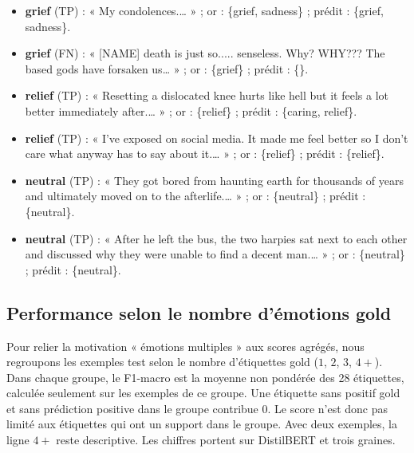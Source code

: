 \begin{itemize}
\item \textbf{grief} (TP) : « My condolences.… » ; or : \{grief, sadness\} ; prédit : \{grief, sadness\}.
\item \textbf{grief} (FN) : « [NAME] death is just so..... senseless. Why? WHY??? The based gods have forsaken us… » ; or : \{grief\} ; prédit : \{\}.
\item \textbf{relief} (TP) : « Resetting a dislocated knee hurts like hell but it feels a lot better immediately after.… » ; or : \{relief\} ; prédit : \{caring, relief\}.
\item \textbf{relief} (TP) : « I've exposed on social media. It made me feel better so I don't care what anyway has to say about it.… » ; or : \{relief\} ; prédit : \{relief\}.
\item \textbf{neutral} (TP) : « They got bored from haunting earth for thousands of years and ultimately moved on to the afterlife.… » ; or : \{neutral\} ; prédit : \{neutral\}.
\item \textbf{neutral} (TP) : « After he left the bus, the two harpies sat next to each other and discussed why they were unable to find a decent man.… » ; or : \{neutral\} ; prédit : \{neutral\}.
\end{itemize}

\subsection{Performance selon le nombre d'émotions gold}
\label{sec:expe-cardinality}

Pour relier la motivation « émotions multiples » aux scores agrégés,
nous regroupons les exemples test selon le nombre d'étiquettes gold
($1$, $2$, $3$, $4+$). Dans chaque groupe, le F1-macro est la moyenne
non pondérée des 28 étiquettes, calculée seulement sur les exemples de
ce groupe. Une étiquette sans positif gold et sans prédiction positive
dans le groupe contribue $0$. Le score n'est donc pas limité aux
étiquettes qui ont un support dans le groupe. Avec deux exemples, la
ligne $4+$ reste descriptive. Les chiffres portent sur DistilBERT et
trois graines.

